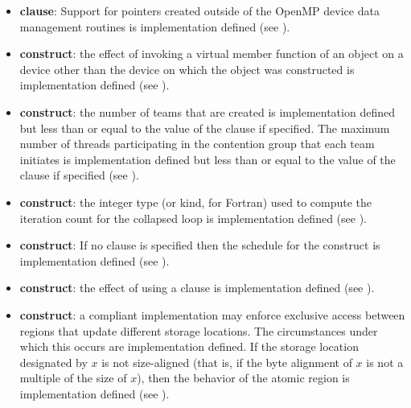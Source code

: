 \begin{itemize}
\item {} \textbf{clause}: 
  Support for pointers created outside of the OpenMP device data management
  routines is implementation defined (see ).

\item {} \textbf{construct}: the effect of invoking a virtual member
function of an object on a device other than the device on which the object was
constructed is implementation defined (see ).

\item {} \textbf{construct}: the number of teams that are created is implementation defined but 
less than or equal to the value of the  clause if specified. The maximum 
number of threads participating in the contention group that each team initiates is 
implementation defined but less than or equal to the value of the  
clause if specified (see ). 

\item {} \textbf{construct}: the integer type (or kind, for
    Fortran) used to compute the iteration count for the collapsed loop is
    implementation defined (see ). 

\item {} \textbf{construct}: If no  clause is specified then the schedule for the  
construct is implementation defined (see ). 

\item {} \textbf{construct}: the effect of using a 
clause is implementation defined (see ). 

\item {} \textbf{construct}: a compliant implementation may enforce exclusive access 
between  regions that update different storage locations. The circumstances 
under which this occurs are implementation defined. If the storage location 
designated by $x$ is not size-aligned (that is, if the byte alignment of $x$ is not a multiple 
of the size of $x$), then the behavior of the atomic region is implementation defined 
(see ).

\begin{fortranspecific}


\end{fortranspecific}
\end{itemize}
